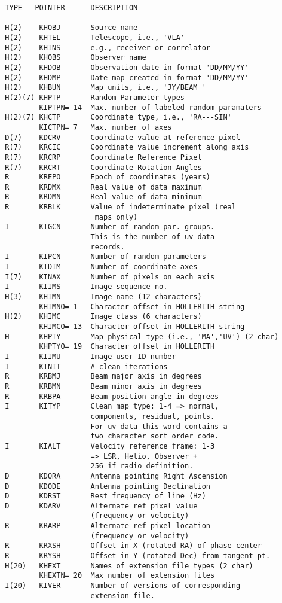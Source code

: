 \begin{verbatim}
  TYPE   POINTER      DESCRIPTION

  H(2)    KHOBJ       Source name
  H(2)    KHTEL       Telescope, i.e., 'VLA'
  H(2)    KHINS       e.g., receiver or correlator
  H(2)    KHOBS       Observer name
  H(2)    KHDOB       Observation date in format 'DD/MM/YY'
  H(2)    KHDMP       Date map created in format 'DD/MM/YY'
  H(2)    KHBUN       Map units, i.e., 'JY/BEAM '
  H(2)(7) KHPTP       Random Parameter types
          KIPTPN= 14  Max. number of labeled random paramaters
  H(2)(7) KHCTP       Coordinate type, i.e., 'RA---SIN'
          KICTPN= 7   Max. number of axes
  D(7)    KDCRV       Coordinate value at reference pixel
  R(7)    KRCIC       Coordinate value increment along axis
  R(7)    KRCRP       Coordinate Reference Pixel
  R(7)    KRCRT       Coordinate Rotation Angles
  R       KREPO       Epoch of coordinates (years)
  R       KRDMX       Real value of data maximum
  R       KRDMN       Real value of data minimum
  R       KRBLK       Value of indeterminate pixel (real
                       maps only)
  I       KIGCN       Number of random par. groups.
                      This is the number of uv data
                      records.
  I       KIPCN       Number of random parameters
  I       KIDIM       Number of coordinate axes
  I(7)    KINAX       Number of pixels on each axis
  I       KIIMS       Image sequence no.
  H(3)    KHIMN       Image name (12 characters)
          KHIMNO= 1   Character offset in HOLLERITH string
  H(2)    KHIMC       Image class (6 characters)
          KHIMCO= 13  Character offset in HOLLERITH string
  H       KHPTY       Map physical type (i.e., 'MA','UV') (2 char)
          KHPTYO= 19  Character offset in HOLLERITH
  I       KIIMU       Image user ID number
  I       KINIT       # clean iterations
  R       KRBMJ       Beam major axis in degrees
  R       KRBMN       Beam minor axis in degrees
  R       KRBPA       Beam position angle in degrees
  I       KITYP       Clean map type: 1-4 => normal,
                      components, residual, points.
                      For uv data this word contains a
                      two character sort order code.
  I       KIALT       Velocity reference frame: 1-3
                      => LSR, Helio, Observer +
                      256 if radio definition.
  D       KDORA       Antenna pointing Right Ascension
  D       KDODE       Antenna pointing Declination
  D       KDRST       Rest frequency of line (Hz)
  D       KDARV       Alternate ref pixel value
                      (frequency or velocity)
  R       KRARP       Alternate ref pixel location
                      (frequency or velocity)
  R       KRXSH       Offset in X (rotated RA) of phase center
  R       KRYSH       Offset in Y (rotated Dec) from tangent pt.
  H(20)   KHEXT       Names of extension file types (2 char)
          KHEXTN= 20  Max number of extension files
  I(20)   KIVER       Number of versions of corresponding
                      extension file.
\end{verbatim}


